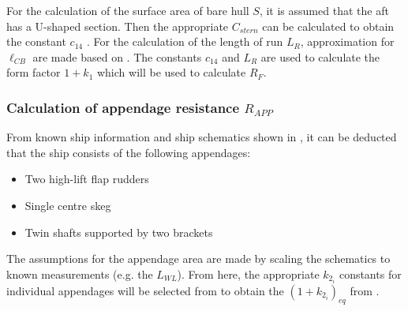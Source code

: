 For the calculation of the surface area of bare hull $S$, it is assumed that the aft has a U-shaped section. Then the appropriate $C_{stern}$ can be calculated to obtain the constant $c_{14}$ . For the calculation of the length of run $L_R$, approximation for $\ell_{CB}$ are made based on . The constants $c_{14}$ and $L_R$ are used to calculate the form factor $1+k_1$ which will be used to calculate $R_F$.

\subsubsection*{Calculation of appendage resistance $R_{APP}$}

From known ship information and ship schematics shown in , it can be deducted that the ship consists of the following appendages:

\begin{itemize}
    \setlength\itemsep{0em}
    \item Two high-lift flap rudders
    \item Single centre skeg
    \item Twin shafts supported by two brackets
\end{itemize}

The assumptions for the appendage area are made by scaling the schematics to known measurements (e.g. the $L_{WL}$). From here, the appropriate $k_{2_i}$ constants for individual appendages will be selected from  to obtain the $(1+k_{2_i})_{eq}$ from .

